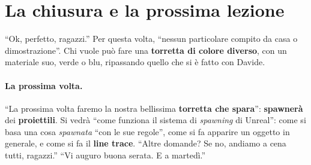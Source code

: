 \section{La chiusura e la prossima lezione}
\label{ue4:sec:chiusura}

``Ok, perfetto, ragazzi.'' Per questa volta, ``nessun particolare compito da casa o
dimostrazione''. Chi vuole può fare una \textbf{torretta di colore diverso}, con un
materiale suo, verde o blu, ripassando quello che si è fatto con Davide.

\paragraph{La prossima volta.} ``La prossima volta faremo la nostra bellissima
\textbf{torretta che spara}'': \textbf{spawnerà} dei \textbf{proiettili}. Si vedrà
``come funziona il sistema di \emph{spawning} di Unreal'': come si basa una cosa
\emph{spawnata} ``con le sue regole'', come si fa apparire un oggetto in generale, e
come si fa il \textbf{line trace}. ``Altre domande? Se no, andiamo a cena tutti,
ragazzi.'' ``Vi auguro buona serata. E a martedì.''

